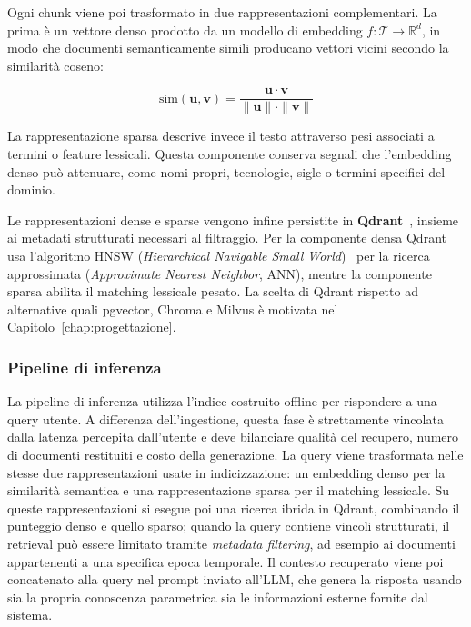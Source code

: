 Ogni chunk viene poi trasformato in due rappresentazioni complementari. La
prima è un vettore denso prodotto da un modello di embedding
$f\colon \mathcal{T} \rightarrow \mathbb{R}^d$, in modo che documenti
semanticamente simili producano vettori vicini secondo la similarità coseno:

\begin{equation}
  \text{sim}(\mathbf{u}, \mathbf{v})
  = \frac{\mathbf{u} \cdot \mathbf{v}}{\|\mathbf{u}\| \cdot \|\mathbf{v}\|}
  \label{eq:cosine}
\end{equation}

La rappresentazione sparsa descrive invece il testo attraverso pesi associati a
termini o feature lessicali. Questa componente conserva segnali che l'embedding
denso può attenuare, come nomi propri, tecnologie, sigle o termini specifici del
dominio.

Le rappresentazioni dense e sparse vengono infine persistite in
\textbf{Qdrant}~\cite{qdrant2023}, insieme ai metadati strutturati necessari al
filtraggio. Per la componente densa Qdrant usa l'algoritmo HNSW
(\textit{Hierarchical Navigable Small World})~\cite{malkov2018efficient} per la
ricerca approssimata (\textit{Approximate Nearest Neighbor}, ANN), mentre la
componente sparsa abilita il matching lessicale pesato. La scelta di Qdrant
rispetto ad alternative quali pgvector, Chroma e Milvus è motivata nel
Capitolo~\ref{chap:progettazione}.

\subsubsection{Pipeline di inferenza}

La pipeline di inferenza utilizza l'indice costruito offline per rispondere a
una query utente. A differenza dell'ingestione, questa fase è strettamente vincolata dalla
latenza percepita dall'utente e deve bilanciare qualità del recupero, numero di documenti
restituiti e costo della generazione. La query viene trasformata nelle stesse
due rappresentazioni usate in indicizzazione: un embedding denso per la
similarità semantica e una rappresentazione sparsa per il matching lessicale.
Su queste rappresentazioni si esegue poi una ricerca ibrida in Qdrant, combinando
il punteggio denso e quello sparso; quando la query contiene vincoli
strutturati, il retrieval può essere limitato tramite \textit{metadata
filtering}, ad esempio ai documenti appartenenti a una specifica epoca
temporale. Il contesto recuperato viene poi concatenato alla query nel prompt
inviato all'LLM, che genera la risposta usando sia la propria conoscenza
parametrica sia le informazioni esterne fornite dal sistema.

